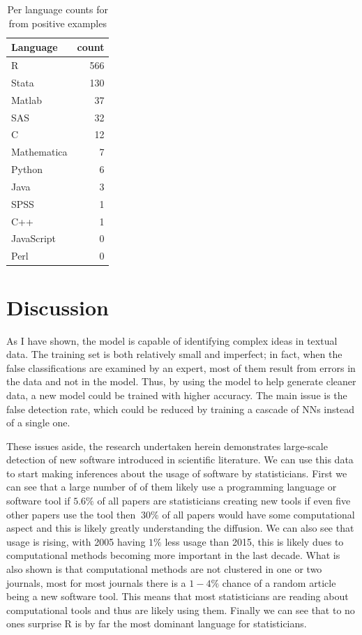 \documentclass[12pt, a4paper]{article}
\begin{document}
\begin{table}[H]
	\centering
	\begin{tabular}{lr}
		\toprule
		Language &  count \\
		\midrule
		R           &    566 \\
		Stata       &    130 \\
		Matlab      &     37 \\
		SAS         &     32 \\
		C           &     12 \\
		Mathematica &      7 \\
		Python      &      6 \\
		Java        &      3 \\
		SPSS        &      1 \\
		C++         &      1 \\
		JavaScript & 0\\
		Perl & 0\\
		\bottomrule
	\end{tabular}
	\caption{Per language counts for from positive examples}\label{ptl}
\end{table}
	
\section{Discussion}

As I have shown, the model is capable of identifying complex ideas in textual data. The training set is both relatively small and imperfect; in fact, when the false classifications are examined by an expert, most of them result from errors in the data and not in the model. Thus, by using the model to help generate  cleaner data, a new model could be trained with higher accuracy. The main issue is the false detection rate, which could be reduced by training a cascade of NNs instead of a single one.

These issues aside, the research undertaken herein demonstrates large-scale detection of new software introduced in scientific literature. We can use this data to start making inferences about the usage of software by statisticians. First we can see that a large number of of them likely use a programming language or software tool if $5.6\%$ of all papers are statisticians creating new tools if even five other papers use the tool then $~30\%$ of all papers would have some computational aspect and this is likely greatly understanding the diffusion. We can also see that usage is rising, with 2005 having $1\%$ less usage than 2015, this is likely dues to computational methods becoming more important in the last decade. What is also shown is that computational methods are not clustered in one or two journals, most for most journals there is a $1-4\%$ chance of a random article being a new software tool. This means that most statisticians are reading about computational tools and thus are likely using them. Finally we can see that to no ones surprise R is by far the most dominant language for statisticians.
\end{document}

